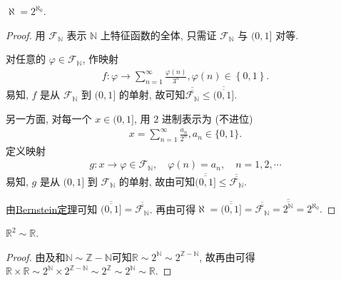 \documentclass[../../main.tex]{subfiles}%
\begin{document}
\begin{theorem}\label{theorem:aleph = 2^{aleph_0}}
$\aleph = 2^{\aleph_0}$.
\end{theorem}
\begin{proof}

用 $\mathcal{F}_{\mathbb{N}}$ 表示 $\mathbb{N}$ 上特征函数的全体, 只需证 $\mathcal{F}_{\mathbb{N}}$ 与 $(0, 1]$ 对等.

对任意的 $\varphi \in \mathcal{F}_{\mathbb{N}}$, 作映射
\begin{align*}
f:\varphi \rightarrow \sum_{n=1}^{\infty}{\frac{\varphi (n)}{3^n}},\varphi \left( n \right) \in \left\{ 0,1 \right\} .
\end{align*}
易知, $f$ 是从 $\mathcal{F}_{\mathbb{N}}$ 到 $(0, 1]$ 的单射, 故可知$\overline{\overline{\mathcal{F}_{\mathbb{N}}}} \leqslant \overline{\overline{(0, 1]}}$.

另一方面, 对每一个 $x \in (0, 1]$, 用 $2$ 进制表示为 (不进位)
\begin{align*}
x = \sum_{n = 1}^{\infty} \frac{a_n}{2^n}, a_n \in \{0, 1\}.
\end{align*}
定义映射
\begin{align*}
g : x \to \varphi \in \mathcal{F}_{\mathbb{N}}, \quad \varphi(n) = a_n, \quad n = 1, 2, \cdots
\end{align*}
易知, $g$ 是从 $(0, 1]$ 到 $\mathcal{F}_{\mathbb{N}}$ 的单射, 故由可知$\overline{\overline{(0, 1]}} \leqslant \overline{\overline{\mathcal{F}_{\mathbb{N}}}}$.

由\hyperref[theorem:Cantor-Bernstein定理]{Bernstein定理}可知 $\overline{\overline{(0, 1]}} = \overline{\overline{\mathcal{F}_{\mathbb{N}}}}$. 再由可得$\aleph =\overline{\overline{(0,1]}}=\overline{\overline{\mathcal{F} _{\mathbb{N}}}}=\overline{\overline{2^{\mathbb{N}}}}=2^{\aleph _0}.$

\end{proof}

\begin{example}
$\mathbb{R}^2 \sim \mathbb{R}$.
\end{example}
\begin{proof}

由及和$\mathbb{N}\sim \mathbb{Z}-\mathbb{N}$可知$\mathbb{R} \sim 2^{\mathbb{N}} \sim 2^{\mathbb{Z} - \mathbb{N}}$, 故再由可得$\mathbb{R} \times \mathbb{R} \sim 2^{\mathbb{N}} \times 2^{\mathbb{Z} - \mathbb{N}} \sim 2^{\mathbb{Z}} \sim 2^{\mathbb{N}} \sim \mathbb{R}$.

\end{proof}
\end{document}
